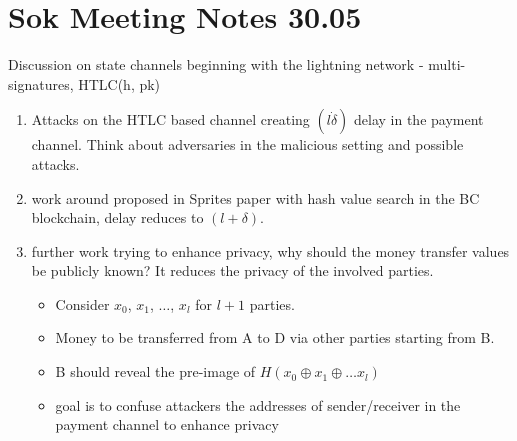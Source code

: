 \documentclass{article}
\begin{document}
\section{Sok Meeting Notes 30.05} Discussion on state channels beginning with the lightning network - multi-signatures, HTLC(h, pk)
\begin{enumerate}
\item Attacks on the HTLC based channel creating $(l\dot\delta)$ delay in the payment channel. Think about adversaries in the malicious setting and possible attacks.
\item work around proposed in Sprites paper with hash value search in the BC blockchain, delay reduces to $(l + \delta)$.
\item further work trying to enhance privacy, why should the money transfer values be publicly known? It reduces the privacy of the involved parties. 
\begin{itemize}
\item Consider $x_0$, $x_1$, $\ldots$, $x_l$ for $l+1$ parties.
\item Money to be transferred from A to D via other parties starting from B.
\item B should reveal the pre-image of $H({x_0}\oplus{x_1}\oplus\ldots{x_l})$
\item goal is to confuse attackers the addresses of sender/receiver in the payment channel to enhance privacy
\end{itemize}
\end{enumerate}


\section{}
\end{document}
